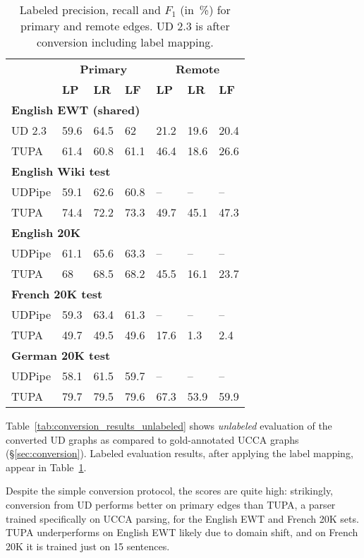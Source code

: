 \documentclass[11pt,a4paper]{article}
\begin{document}
\begin{table}[t]
\centering
\begin{tabular}{l|lll|lll}
& \multicolumn{3}{c|}{\footnotesize \bf Primary} & \multicolumn{3}{c}{\footnotesize \bf Remote} \\
& \footnotesize \textbf{LP} & \footnotesize \textbf{LR} & \footnotesize \textbf{LF}
& \footnotesize \textbf{LP} & \footnotesize \textbf{LR} & \footnotesize \textbf{LF} \\
\hline
\multicolumn{4}{l|}{\small \bf English EWT (shared)} & \\
\footnotesize UD 2.3
& 59.6 & 64.5 & 62 & 21.2 & 19.6 & 20.4 \\
\footnotesize TUPA
& 61.4 & 60.8 & 61.1 & 46.4 & 18.6 & 26.6 \\
\multicolumn{4}{l|}{\small \bf English Wiki test} & \\
\footnotesize UDPipe
& 59.1 & 62.6 & 60.8 & -- & -- & -- \\
\footnotesize TUPA
& 74.4 & 72.2 & 73.3 & 49.7 & 45.1 & 47.3 \\
\multicolumn{4}{l|}{\small \bf English 20K} & \\
\footnotesize UDPipe
& 61.1 & 65.6 & 63.3 & -- & -- & -- \\
\footnotesize TUPA
& 68 & 68.5 & 68.2 & 45.5 & 16.1 & 23.7 \\
\multicolumn{4}{l|}{\small \bf French 20K test} & \\
\footnotesize UDPipe
& 59.3 & 63.4 & 61.3 & -- & -- & -- \\
\footnotesize TUPA
& 49.7 & 49.5 & 49.6 & 17.6 & 1.3 & 2.4 \\
\multicolumn{4}{l|}{\small \bf German 20K test} & \\
\footnotesize UDPipe
& 58.1 & 61.5 & 59.7 & -- & -- & -- \\
\footnotesize TUPA
& 79.7 & 79.5 & 79.6 & 67.3 & 53.9 & 59.9
\end{tabular}
\caption{
Labeled precision, recall and $F_1$ (in~\%) for primary and remote edges.
UD 2.3 is after conversion including label mapping.
\label{tab:conversion_results_labeled}}
\end{table}

Table~\ref{tab:conversion_results_unlabeled} shows \textit{unlabeled} evaluation of the
converted UD graphs as compared to gold-annotated UCCA graphs (\S\ref{sec:conversion}).
Labeled evaluation results, after applying the label mapping,
appear in Table~\ref{tab:conversion_results_labeled}.

Despite the simple conversion protocol, the scores are quite high:
strikingly, conversion from UD performs better on primary edges than
TUPA, a parser trained specifically on UCCA parsing,
for the English EWT and French 20K sets.
TUPA underperforms on English EWT likely due to domain shift,
and on French 20K it is trained just on 15 sentences.
\end{document}
